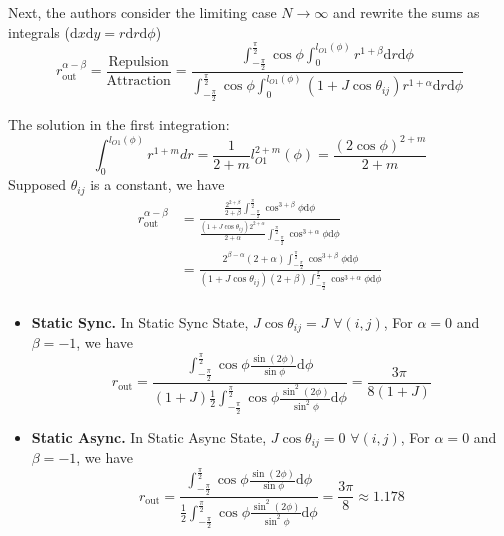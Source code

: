 \documentclass[10pt,aspectratio=43,mathserif,table]{beamer}
\begin{document}
\begin{frame}
    Next, the authors consider the limiting case $N \rightarrow \infty$
    and rewrite the sums as integrals ($\mathrm{d}x\mathrm{d}y = r\mathrm{d}r\mathrm{d}\phi$)
    \vspace{-0.3cm}
    $$
    r_{\mathrm{out}}^{\alpha -\beta}=\frac{\mathrm{Repulsion}}{\mathrm{Attraction}}=\frac{\int_{-\frac{\pi}{2}}^{\frac{\pi}{2}}{\cos \phi \int_0^{l_{O1}\left( \phi \right)}{r^{1+\beta}\mathrm{d}r\mathrm{d}\phi}}}{\int_{-\frac{\pi}{2}}^{\frac{\pi}{2}}{\cos \phi \int_0^{l_{O1}\left( \phi \right)}{\left( 1+J\cos \theta _{ij} \right) r^{1+\alpha}\mathrm{d}r\mathrm{d}\phi}}}
    $$
\end{frame}

\begin{frame}
    The solution in the first integration: 
    $$
    \int_0^{l_{O1}\left( \phi \right)}{r^{1+m}dr}=\frac{1}{2+m}l_{O1}^{2+m}\left( \phi \right) =\frac{\left( 2\cos \phi \right) ^{2+m}}{2+m}
    $$
    Supposed $\theta_{ij}$ is a constant, we have
    $$
    \begin{aligned}
        r_{\mathrm{out}}^{\alpha -\beta}&=\frac{\frac{2^{2+\beta}}{2+\beta}\int_{-\frac{\pi}{2}}^{\frac{\pi}{2}}{\cos ^{3+\beta}\phi \mathrm{d}\phi}}{\frac{\left( 1+J\cos \theta _{ij} \right) 2^{2+\alpha}}{2+\alpha}\int_{-\frac{\pi}{2}}^{\frac{\pi}{2}}{\cos ^{3+\alpha}\phi \mathrm{d}\phi}}\\
        &=\frac{2^{\beta -\alpha}\left( 2+\alpha \right) \int_{-\frac{\pi}{2}}^{\frac{\pi}{2}}{\cos ^{3+\beta}\phi \mathrm{d}\phi}}{\left( 1+J\cos \theta _{ij} \right) \left( 2+\beta \right) \int_{-\frac{\pi}{2}}^{\frac{\pi}{2}}{\cos ^{3+\alpha}\phi \mathrm{d}\phi}}\\
    \end{aligned}
    $$



\end{frame}

\begin{frame}
    \begin{itemize}
        \item \textbf{Static Sync.} In Static Sync State, $J\cos \theta _{ij}=J\,\,\forall \left( i, j \right)$, For $\alpha = 0$ and $\beta=-1$, we have
        $$
            r_{\mathrm{out}}=\frac{\int_{-\frac{\pi}{2}}^{\frac{\pi}{2}}{\cos \phi \frac{\sin \left( 2\phi \right)}{\sin \phi}\mathrm{d}\phi}}{\left( 1+J \right) \frac{1}{2}\int_{-\frac{\pi}{2}}^{\frac{\pi}{2}}{\cos \phi \frac{\sin ^2\left( 2\phi \right)}{\sin ^2\phi}\mathrm{d}\phi}}=\frac{3\pi}{8\left( 1+J \right)}
        $$


        \item \textbf{Static Async.} In Static Async State, $J\cos \theta _{ij}=0\,\,\forall \left( i, j \right)$, For $\alpha = 0$ and $\beta=-1$, we have
        $$
            r_{\mathrm{out}}=\frac{\int_{-\frac{\pi}{2}}^{\frac{\pi}{2}}{\cos \phi \frac{\sin \left( 2\phi \right)}{\sin \phi}\mathrm{d}\phi}}{ \frac{1}{2}\int_{-\frac{\pi}{2}}^{\frac{\pi}{2}}{\cos \phi \frac{\sin ^2\left( 2\phi \right)}{\sin ^2\phi}\mathrm{d}\phi}}=\frac{3\pi}{8}\approx 1.178
        $$
    \end{itemize}
\end{frame}




\end{document}
